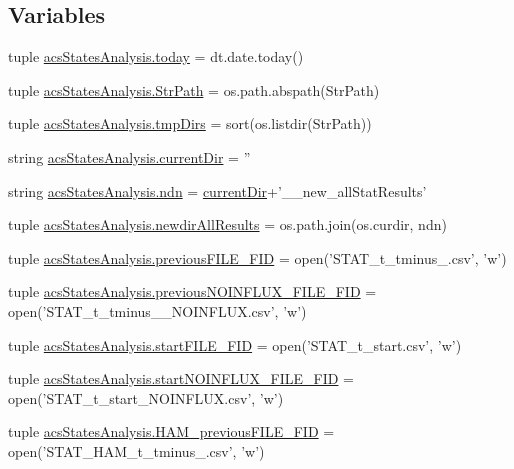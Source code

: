 \subsection*{Variables}
\begin{DoxyCompactItemize}
\item 
tuple \hyperlink{a00098_ac99ee9d8196d8a2305b9f4c795b23b97}{acs\-States\-Analysis.\-today} = dt.\-date.\-today()
\item 
tuple \hyperlink{a00098_ac34f3f43f888eb6620266d78ce928ceb}{acs\-States\-Analysis.\-Str\-Path} = os.\-path.\-abspath(Str\-Path)
\item 
tuple \hyperlink{a00098_ab71c19ee20acae0f07934a8d0e9fe50b}{acs\-States\-Analysis.\-tmp\-Dirs} = sort(os.\-listdir(Str\-Path))
\item 
string \hyperlink{a00098_ae98225d5c8c20399f5c3b888fa37746f}{acs\-States\-Analysis.\-current\-Dir} = ''
\item 
string \hyperlink{a00098_a5e117df6e0cdffdae13947622c6c4890}{acs\-States\-Analysis.\-ndn} = \hyperlink{a00025_af32eb97339f1e9d37b5540de2cbc79c9}{current\-Dir}+'\-\_\-\_\-new\-\_\-all\-Stat\-Results'
\item 
tuple \hyperlink{a00098_a62d6cfd52b4428ab7ea4d75d43b2d49b}{acs\-States\-Analysis.\-newdir\-All\-Results} = os.\-path.\-join(os.\-curdir, ndn)
\item 
tuple \hyperlink{a00098_aba65725a1bd6d1b891b02dc7f3db2335}{acs\-States\-Analysis.\-previous\-F\-I\-L\-E\-\_\-\-F\-I\-D} = open('S\-T\-A\-T\-\_\-t\-\_\-tminus\-\_.\-csv', 'w')
\item 
tuple \hyperlink{a00098_a9f9485bf6f7a3734bbd110b756005b71}{acs\-States\-Analysis.\-previous\-N\-O\-I\-N\-F\-L\-U\-X\-\_\-\-F\-I\-L\-E\-\_\-\-F\-I\-D} = open('S\-T\-A\-T\-\_\-t\-\_\-tminus\-\_\-\_\-\-N\-O\-I\-N\-F\-L\-U\-X.\-csv', 'w')
\item 
tuple \hyperlink{a00098_a0239a9dcc4900463a0c19557bec23521}{acs\-States\-Analysis.\-start\-F\-I\-L\-E\-\_\-\-F\-I\-D} = open('S\-T\-A\-T\-\_\-t\-\_\-start.\-csv', 'w')
\item 
tuple \hyperlink{a00098_a44f4f158af9771fbabbbacc4f4484d32}{acs\-States\-Analysis.\-start\-N\-O\-I\-N\-F\-L\-U\-X\-\_\-\-F\-I\-L\-E\-\_\-\-F\-I\-D} = open('S\-T\-A\-T\-\_\-t\-\_\-start\-\_\-\-N\-O\-I\-N\-F\-L\-U\-X.\-csv', 'w')
\item 
tuple \hyperlink{a00098_a3aad86d2cdbfb6f36b4b563b190d76c9}{acs\-States\-Analysis.\-H\-A\-M\-\_\-previous\-F\-I\-L\-E\-\_\-\-F\-I\-D} = open('S\-T\-A\-T\-\_\-\-H\-A\-M\-\_\-t\-\_\-tminus\-\_.\-csv', 'w')
\item 

\end{DoxyCompactItemize}
